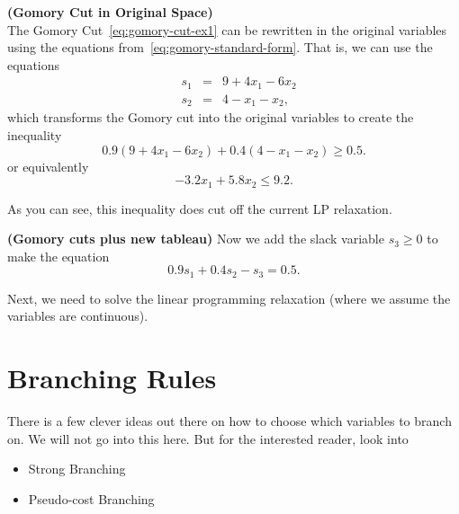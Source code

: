 \documentclass[../open-optimization/open-optimization.tex]{subfiles}
\begin{document}
\begin{example}\textbf{(Gomory Cut in Original Space)}\\

The Gomory Cut~\eqref{eq:gomory-cut-ex1} can be rewritten in the original variables using the equations from~\eqref{eq:gomory-standard-form}.  That is, we can use the equations
\begin{equation}
\label{eq:gomory-standard-form-equations}
\begin{array}{lrcl}
 & s_1 & = & 9 + 4x_1 - 6x_2\\
&s_2  & = & 4 - x_1 - x_2,
\end{array}
\end{equation}
which transforms the Gomory cut into the original variables to create the inequality
\begin{equation*}
\label{eq:gomory-cut-ex1-original}
0.9 (9 + 4x_1 - 6x_2) + 0.4(4 - x_1 - x_2) \geq 0.5.
\end{equation*}
or equivalently
\begin{equation}
\label{eq:gomory-cut-ex1-original}
- 3.2 x_1 + 5.8 x_2 \leq 9.2.
\end{equation}
%

As you can see, this inequality does cut off the current LP relaxation.

\end{example}


\begin{example}{\textbf{(Gomory  cuts plus new tableau)}}{}
Now we add the slack variable $s_3 \geq 0$ to make the equation
\begin{equation}
0.9 s_1 + 0.4 s_2 - s_3 = 0.5.
\end{equation}


\end{example}


Next, we need to solve the linear programming relaxation (where we assume the variables are continuous).




\section{Branching Rules}
There is a few clever ideas out there on how to choose which variables to branch on.  We will not go into this here.  But for the interested reader, look into 
\begin{itemize}
\item Strong Branching
\item Pseudo-cost Branching
\end{itemize}
\end{document}
